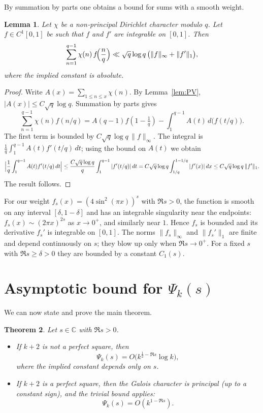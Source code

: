\documentclass[11pt,a4paper]{article}
\newtheorem{theorem}{Theorem}[section]
\newtheorem{lemma}[theorem]{Lemma}
\theoremstyle{definition}
\theoremstyle{remark}
\begin{document}
By summation by parts one obtains a bound for sums with a smooth weight.

\begin{lemma}\label{lem:weighted}
Let $\chi$ be a non‑principal Dirichlet character modulo $q$.  Let $f\in C^1[0,1]$ be such that
$f$ and $f'$ are integrable on $[0,1]$.  Then
\[
\sum_{n=1}^{q-1}\chi(n)\,f\!\Bigl(\frac{n}{q}\Bigr)
   \ll \sqrt{q}\log q\,\bigl(\|f\|_\infty+\|f'\|_1\bigr),
\]
where the implied constant is absolute.
\end{lemma}

\begin{proof}
Write $A(x)=\sum_{1\le n\le x}\chi(n)$.  By Lemma~\ref{lem:PV}, $|A(x)|\le C\sqrt{q}\log q$.
Summation by parts gives
\[
\sum_{n=1}^{q-1}\chi(n)f(n/q)
   =A(q-1)f(1-\tfrac1q)-\int_1^{q-1}A(t)\,d\bigl(f(t/q)\bigr).
\]
The first term is bounded by $C\sqrt{q}\log q\,\|f\|_\infty$.
The integral is $\frac1q\int_1^{q-1}A(t)f'(t/q)\,dt$; using the bound on $A(t)$ we obtain
\[
\Bigl|\frac1q\int_1^{q-1}A(t)f'(t/q)\,dt\Bigr|
   \le \frac{C\sqrt{q}\log q}{q}\int_1^{q-1}|f'(t/q)|\,dt
   = C\sqrt{q}\log q\int_{1/q}^{1-1/q}|f'(x)|\,dx
   \le C\sqrt{q}\log q\,\|f'\|_1 .
\]
The result follows.
\end{proof}

For our weight $f_s(x)=(4\sin^2(\pi x))^{s}$ with $\Re s>0$, the function is smooth on any
interval $[\delta,1-\delta]$ and has an integrable singularity near the endpoints:
$f_s(x)\sim (2\pi x)^{2s}$ as $x\to0^+$, and similarly near $1$.  Hence $f_s$ is bounded
and its derivative $f_s'$ is integrable on $[0,1]$.  The norms $\|f_s\|_\infty$ and
$\|f_s'\|_1$ are finite and depend continuously on $s$; they blow up only when $\Re s\to0^+$.
For a fixed $s$ with $\Re s\ge\delta>0$ they are bounded by a constant $C_1(s)$.

\section{Asymptotic bound for $\Psi_k(s)$}

We can now state and prove the main theorem.

\begin{theorem}\label{thm:main}
Let $s\in\mathbb C$ with $\Re s>0$.
\begin{itemize}
\item[(i)] If $k+2$ is not a perfect square, then
   \[
   \Psi_k(s)=O\bigl(k^{\frac12-\Re s}\log k\bigr),
   \]
   where the implied constant depends only on $s$.
\item[(ii)] If $k+2$ is a perfect square, then the Galois character is principal (up to a
   constant sign), and the trivial bound applies:
   \[
   \Psi_k(s)=O(k^{1-\Re s}).
   \]
\end{itemize}
\end{theorem}
\end{document}

